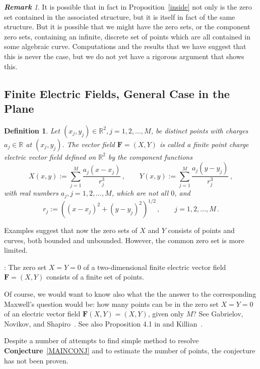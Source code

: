 \documentclass{article}
\newtheorem{defn}[thm]{\bf Definition}
\theoremstyle{remark}
\newtheorem{rem}[thm]{\bf Remark}
\numberwithin{equation}{section}
\begin{document}
\medskip

\begin{rem} It is possible that in fact in Proposition~\ref{inside} not only is the zero set contained in the associated structure, but it is itself in fact of the same structure.  
But it is possible that we might have the zero sets, or the component zero sets, containing an infinite, discrete set of points which are all contained in some algebraic curve. 
Computations and the results that we have suggest that this is never the case, but we do not yet have a rigorous argument that shows this.
\end{rem}


\subsection{Finite Electric Fields, General Case in the Plane}\label{GenPlane}

\begin{defn}\label{FEF2}
Let $(x_j,y_j) \in {\mathbb R}^2, j=1,2,\ldots,M$, be distinct points with charges $a_j \in {\mathbb R}$ at $(x_j,y_j)$. The vector field ${\mathbf F}=(X,Y)$
is called a finite point charge electric vector field defined on ${\mathbb R}^2$ by the component functions
$$X(x,y) := \sum_{j=1}^M{\frac{a_j(x-x_j)}{r_j^3}}\,, \qquad  Y(x,y) := \sum_{j=1}^M{\frac{a_j(y-y_j)}{r_j^3}}\,,$$
with real numbers $a_j, j=1,2,\ldots,M$, which are not all $0$, and
$$r_j := ((x-x_j)^2+ (y-y_j)^2)^{1/2}\,, \qquad j=1,2, \dots,M\,.$$
\end{defn}

Examples suggest that now the zero sets of $X$ and $Y$ consists of points and curves, both bounded and unbounded. However, the common zero set is more limited.
\medskip

\label{MAINCONJ}: The zero set $X=Y=0$ of a two-dimensional finite electric vector field ${\mathbf F}=(X,Y)$ consists of a finite set of points.
\medskip

\noindent Of course, we would want to know also what the the answer to the corresponding Maxwell's question  would be: how many points can be in the zero set 
$X=Y=0$ of an electric vector field ${\mathbf F}(X,Y)=(X,Y)$, given only $M$?  
See Gabrielov, Novikov, and Shapiro~\cite{GNS}.  See also Proposition 4.1 in \cite{AHKT} and Killian~\cite{K}.

Despite a number of attempts to find simple method to resolve {\bf Conjecture}~\ref{MAINCONJ} and to estimate the number of points, the conjecture has not been proven.  
\end{document}
